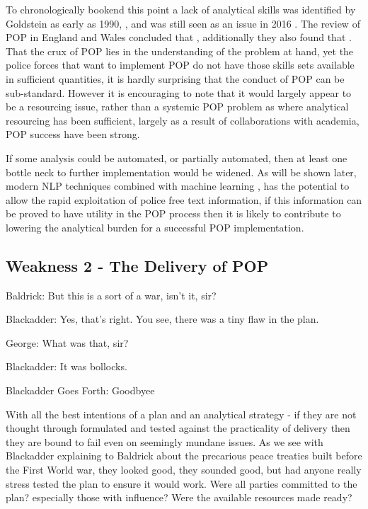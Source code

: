 To chronologically bookend this point a lack of analytical skills was identified by Goldstein as early as 1990, \parencite{goldstein1990}, and was still seen as an issue in 2016 \parencite{popchap11}. The review of POP in England and Wales \parencite{POPUCL} concluded that , additionally they also found that . That the crux of POP lies in the understanding of the problem at hand, yet the police forces that want to implement POP do not have those skills sets available in sufficient quantities, it is hardly surprising that the conduct of POP can be sub-standard.  However it is encouraging to note that it would largely appear to be a resourcing issue, rather than a systemic POP problem as where analytical resourcing has been sufficient, largely as a result of collaborations with academia, POP success have been strong. 

If some analysis could be automated, or partially automated,  then at least one bottle neck to further implementation would be widened. As will be shown later, modern NLP techniques combined with machine learning , has the potential to allow the rapid exploitation of police free text information, if this information can be proved to have utility in the POP process then it is likely to contribute to lowering the analytical burden for a successful POP implementation. 


\subsection{Weakness 2 - The Delivery of POP}


\epigraph{\centering Baldrick:  But this is a sort of a war, isn't it, sir?
 
Blackadder: Yes, that's right.  You see, there was a tiny flaw in the plan.
 
George:   What was that, sir?
 
Blackadder:  It was bollocks.}{Blackadder Goes Forth: Goodbyee }


With all the best intentions of a plan and an analytical strategy - if they are not thought through formulated and tested against the practicality of delivery then they are bound to fail even on seemingly mundane issues. As we see with Blackadder explaining to Baldrick about the precarious peace treaties built before the First World war, they looked good, they sounded good, but had anyone really stress tested the plan to ensure it would work. Were all parties committed to the plan? especially those with influence? Were the available resources made ready? 

